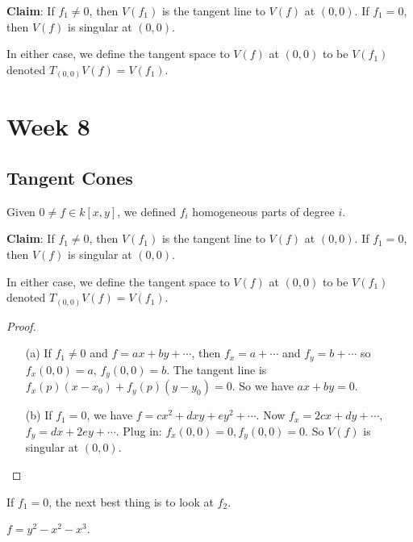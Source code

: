\documentclass{report}
\begin{document}
\textbf{Claim}: If $f_{1} \neq 0$, then $V(f_{1})$ is the tangent line to $V(f)$ at $(0, 0)$. If $f_{1} = 0$, then $V(f)$ is singular at $(0, 0)$.

In either case, we define the tangent space to $V(f)$ at $(0, 0)$ to be $V(f_{1})$ denoted $T_{(0, 0)}V(f) = V(f_1)$.

\chapter{Week 8}

\begin{topic}
    \section{Tangent Cones}
\end{topic}

Given $0 \neq f \in k[x, y]$, we defined $f_{i}$ homogeneous parts of degree $i$.

\textbf{Claim}: If $f_{1} \neq 0$, then $V(f_{1})$ is the tangent line to $V(f)$ at $(0, 0)$. If $f_{1} = 0$, then $V(f)$ is singular at $(0, 0)$.

In either case, we define the tangent space to $V(f)$ at $(0, 0)$ to be $V(f_{1})$ denoted $T_{(0, 0)}V(f) = V(f_1)$.
    \begin{proof}
        \begin{itemize}
            \item [(a)] If $f_{1} \neq 0$ and $f = ax + by + \cdots $, then $f_{x} = a + \cdots $ and $f_{y} = b + \cdots $ so $f_{x}(0, 0)= a$, $f_{y}(0, 0) = b$. The tangent line is $f_{x}(p)(x - x_{0}) + f_{y}(p)(y - y_{0}) = 0$. So we have $ax + by = 0$.

            \item [(b)] If $f_{1} = 0$, we have $f = cx^{2} + d xy + ey^{2} + \cdots $. Now $f_{x} = 2cx + dy + \cdots $, $f_{y} = d x + 2ey + \cdots $. Plug in: $f_{x}(0, 0) = 0, f_{y}(0, 0) = 0$. So $V(f)$ is singular at $(0, 0)$. 
        \end{itemize}
    \end{proof}

If $f_{1} = 0$, the next best thing is to look at $f_{2}$.

\begin{examples}
    \begin{example}
        $f = y^{2} - x^{2} - x^{3}$.
    \end{example}
\end{examples}
\end{document}
